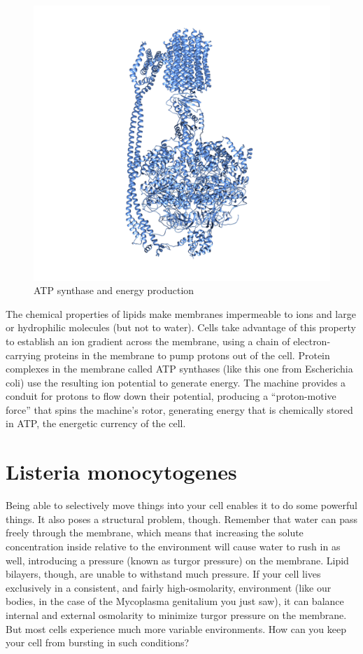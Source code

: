 \documentclass[]{tufte-book}
\begin{document}
\begin{figure}
\includegraphics{img/02_schematic/2_1_2_ATPsynthase} \caption[ATP synthase and energy production]{ATP synthase and energy production}\label{fig:2-1-2}
\end{figure}

The chemical properties of lipids make membranes impermeable to ions and
large or hydrophilic molecules (but not to water). Cells take advantage
of this property to establish an ion gradient across the membrane, using
a chain of electron-carrying proteins in the membrane to pump protons
out of the cell. Protein complexes in the membrane called ATP synthases
(like this one from Escherichia coli) use the resulting ion potential to
generate energy. The machine provides a conduit for protons to flow down
their potential, producing a ``proton-motive force'' that spins the
machine's rotor, generating energy that is chemically stored in ATP, the
energetic currency of the cell.

\section{Listeria monocytogenes}\label{listeria-monocytogenes}

Being able to selectively move things into your cell enables it to do
some powerful things. It also poses a structural problem, though.
Remember that water can pass freely through the membrane, which means
that increasing the solute concentration inside relative to the
environment will cause water to rush in as well, introducing a pressure
(known as turgor pressure) on the membrane. Lipid bilayers, though, are
unable to withstand much pressure. If your cell lives exclusively in a
consistent, and fairly high-osmolarity, environment (like our bodies, in
the case of the Mycoplasma genitalium you just saw), it can balance
internal and external osmolarity to minimize turgor pressure on the
membrane. But most cells experience much more variable environments. How
can you keep your cell from bursting in such conditions?
\end{document}
